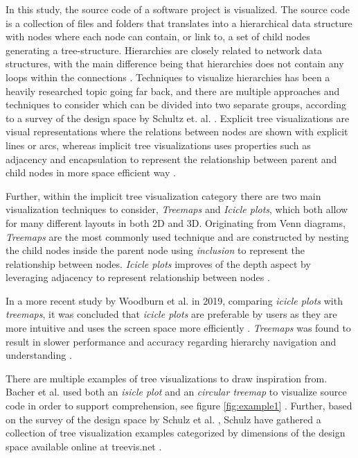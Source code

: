 In this study, the source code of a software project is visualized.
The source code is a collection of files and folders that translates into a hierarchical data structure with nodes where each node can contain, or link to, a set of child nodes generating a tree-structure.
Hierarchies are closely related to network data structures, with the main difference being that hierarchies does not contain any loops within the connections \cite{spence_information_2014}.
Techniques to visualize hierarchies has been a heavily researched topic going far back, and there are multiple approaches and techniques to consider which can be divided into two separate groups, according to a survey of the design space by Schultz et. al. \cite{schulz_design_2011}.
Explicit tree visualizations are visual representations where the relations between nodes are shown with explicit lines or arcs, whereas implicit tree visualizations uses properties such as adjacency and encapsulation to represent the relationship between parent and child nodes in more space efficient way \cite{schulz_design_2011}.

Further, within the implicit tree visualization category there are two main visualization techniques to consider, \textit{Treemaps} and \textit{Icicle plots}, which both allow for many different layouts in both 2D and 3D.
Originating from Venn diagrams, \textit{Treemaps} are the most commonly used technique and are constructed by nesting the child nodes inside the parent node using \textit{inclusion} to represent the relationship between nodes.
\textit{Icicle plots} improves of the depth aspect by leveraging adjacency to represent relationship between nodes \cite{schulz_design_2011}.

In a more recent study by Woodburn et al. in 2019, comparing \textit{icicle plots} with \textit{treemaps}, it was concluded that \textit{icicle plots} are preferable by users as they are more intuitive and uses the screen space more efficiently \cite{woodburn_interactive_2019}.
\textit{Treemaps} was found to result in slower performance and accuracy regarding hierarchy navigation and understanding \cite{woodburn_interactive_2019}.

% 


There are multiple examples of tree visualizations to draw inspiration from.
Bacher et al. used both an \textit{isicle plot} and an \textit{circular treemap} to visualize source code in order to support comprehension, see figure \ref{fig:example1} \cite{bacher_using_2016}.
Further, based on the survey of the design space by Schulz et al. \cite{schulz_design_2011}, Schulz have gathered a collection of tree visualization examples categorized by dimensions of the design space available online at treevis.net \cite{schulz_treevisnet_2011}.
